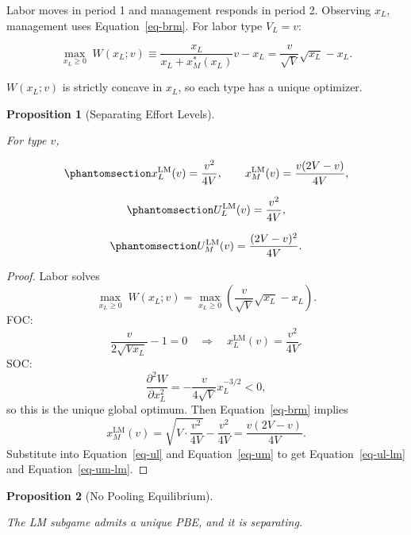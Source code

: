 \documentclass[
  english,
  a4paper,
  12pt]{article}
\theoremstyle{plain}
\newtheorem{proposition}{Proposition}[section]
\theoremstyle{plain}
\theoremstyle{definition}
\theoremstyle{remark}
\begin{document}
Labor moves in period 1 and management responds in period 2. Observing
\(x_L\), management uses Equation~\ref{eq-brm}. For labor type
\(V_L=v\):

\[
\max_{x_L \geq 0}\;
W(x_L;v)
\equiv
\frac{x_L}{x_L + x_M^*(x_L)}v - x_L
=
\frac{v}{\sqrt{V}}\sqrt{x_L} - x_L.
\]

\(W(x_L;v)\) is strictly concave in \(x_L\), so each type has a unique
optimizer.

\begin{proposition}[Separating Effort
Levels]\protect\hypertarget{prp-separating}{}\label{prp-separating}

For type \(v\),

\begin{equation}\phantomsection\label{eq-lm-efforts}{
x_L^{\mathrm{LM}}(v) = \frac{v^2}{4V},
\qquad
x_M^{\mathrm{LM}}(v) = \frac{v(2V - v)}{4V},
}\end{equation}

\begin{equation}\phantomsection\label{eq-ul-lm}{
U_L^{\mathrm{LM}}(v) = \frac{v^2}{4V},
}\end{equation}

\begin{equation}\phantomsection\label{eq-um-lm}{
U_M^{\mathrm{LM}}(v) = \frac{(2V - v)^2}{4V}.
}\end{equation}

\end{proposition}

\begin{proof}
Labor solves \[
\max_{x_L\ge 0}\;W(x_L;v)=\max_{x_L\ge 0}\left(\frac{v}{\sqrt V}\sqrt{x_L}-x_L\right).
\] FOC: \[
\frac{v}{2\sqrt{Vx_L}} - 1 = 0
\quad\Rightarrow\quad
x_L^{\mathrm{LM}}(v)=\frac{v^2}{4V}.
\] SOC: \[
\frac{\partial^2 W}{\partial x_L^2}=-\frac{v}{4\sqrt V}x_L^{-3/2}<0,
\] so this is the unique global optimum. Then Equation~\ref{eq-brm}
implies \[
x_M^{\mathrm{LM}}(v)
=\sqrt{V\cdot\frac{v^2}{4V}}-\frac{v^2}{4V}
=\frac{v(2V-v)}{4V}.
\] Substitute into Equation~\ref{eq-ul} and Equation~\ref{eq-um} to get
Equation~\ref{eq-ul-lm} and Equation~\ref{eq-um-lm}.
\end{proof}

\begin{proposition}[No Pooling
Equilibrium]\protect\hypertarget{prp-no-pool}{}\label{prp-no-pool}

The LM subgame admits a unique PBE, and it is separating.

\end{proposition}
\end{document}
